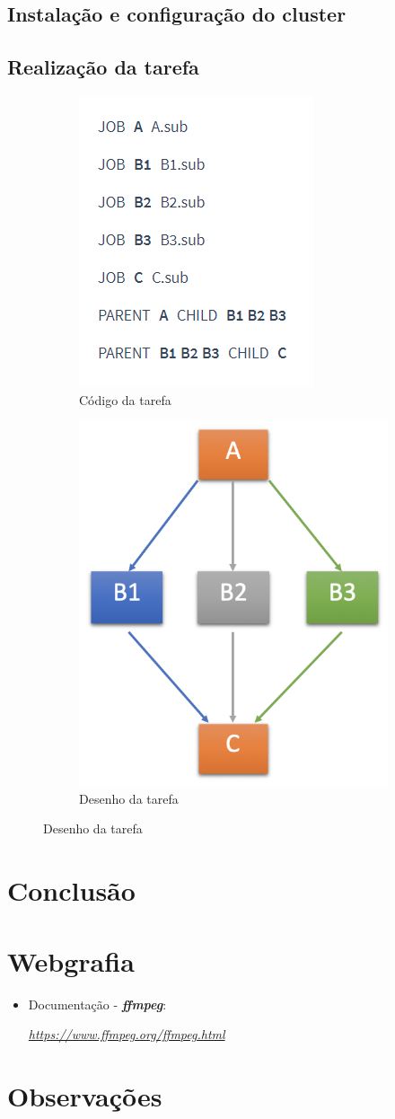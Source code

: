 \documentclass[a4paper]{report}
\begin{document}
    \section{Instalação e configuração do cluster}
	
    
    \section{Realização da tarefa}

	\begin{figure}
		\centering
			\begin{subfigure}{0.4\textwidth}
				\centering
				\includegraphics[width=.4\linewidth]{DAG.png}
				\caption{Código da tarefa}
				\label{fig:sub1}
			\end{subfigure}%
		
			\begin{subfigure}{0.4\textwidth}
				\centering
				\includegraphics[width=.4\linewidth]{Arquitetura-HTCondor.png}
				\caption{Desenho da tarefa}
				\label{fig:sub2}
			\end{subfigure}
	\end{figure}

\chapter{Conclusão}
\large{

}

\chapter{Webgrafia}
    \begin{itemize}
        \item Documentação - \textbf{\textit{ffmpeg}}:
        \par \textit{\url{https://www.ffmpeg.org/ffmpeg.html}}
    \end{itemize}

\appendix
\chapter{Observações}
\end{document}
